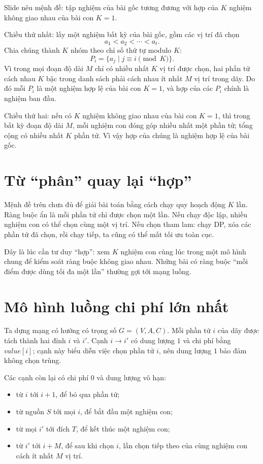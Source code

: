 \documentclass[11pt]{article}
\begin{document}
Slide nêu mệnh đề: tập nghiệm của bài gốc tương đương với hợp của \(K\) nghiệm
không giao nhau của bài con \(K=1\).

Chiều thứ nhất: lấy một nghiệm bất kỳ của bài gốc, gồm các vị trí đã chọn
\[
  a_1<a_2<\cdots<a_t.
\]
Chia chúng thành \(K\) nhóm theo chỉ số thứ tự modulo \(K\):
\[
  P_i=\{a_j\mid j\equiv i \pmod K\}.
\]
Vì trong mọi đoạn độ dài \(M\) chỉ có nhiều nhất \(K\) vị trí được chọn, hai
phần tử cách nhau \(K\) bậc trong danh sách phải cách nhau ít nhất \(M\) vị
trí trong dãy. Do đó mỗi \(P_i\) là một nghiệm hợp lệ của bài con \(K=1\), và
hợp của các \(P_i\) chính là nghiệm ban đầu.

Chiều thứ hai: nếu có \(K\) nghiệm không giao nhau của bài con \(K=1\), thì
trong bất kỳ đoạn độ dài \(M\), mỗi nghiệm con đóng góp nhiều nhất một phần
tử; tổng cộng có nhiều nhất \(K\) phần tử. Vì vậy hợp của chúng là nghiệm hợp
lệ của bài gốc.

\section{Từ ``phân'' quay lại ``hợp''}

Mệnh đề trên chưa đủ để giải bài toán bằng cách chạy quy hoạch động \(K\) lần.
Ràng buộc ẩn là mỗi phần tử chỉ được chọn một lần. Nếu chạy độc lập, nhiều
nghiệm con có thể chọn cùng một vị trí. Nếu chọn tham lam: chạy DP, xóa các
phần tử đã chọn, rồi chạy tiếp, ta cũng có thể mất tối ưu toàn cục.

Đây là lúc cần tư duy ``hợp'': xem \(K\) nghiệm con cùng lúc trong một mô hình
chung để kiểm soát ràng buộc không giao nhau. Những bài có ràng buộc ``mỗi
điểm được dùng tối đa một lần'' thường gợi tới mạng luồng.

\section{Mô hình luồng chi phí lớn nhất}

Ta dựng mạng có hướng có trọng số \(G=(V,A,C)\). Mỗi phần tử \(i\) của dãy
được tách thành hai đỉnh \(i\) và \(i'\). Cạnh \(i\to i'\) có dung lượng
\(1\) và chi phí bằng \(\mathit{value}[i]\); cạnh này biểu diễn việc chọn phần
tử \(i\), nên dung lượng \(1\) bảo đảm không chọn trùng.

Các cạnh còn lại có chi phí \(0\) và dung lượng vô hạn:
\begin{itemize}
  \item từ \(i\) tới \(i+1\), để bỏ qua phần tử;
  \item từ nguồn \(S\) tới mọi \(i\), để bắt đầu một nghiệm con;
  \item từ mọi \(i'\) tới đích \(T\), để kết thúc một nghiệm con;
  \item từ \(i'\) tới \(i+M\), để sau khi chọn \(i\), lần chọn tiếp theo của
  cùng nghiệm con cách ít nhất \(M\) vị trí.
\end{itemize}
\end{document}

